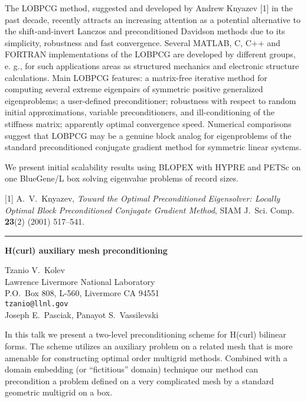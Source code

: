 \documentclass[twosided]{report}
\begin{document}
 The LOBPCG method,
suggested and developed by Andrew Knyazev [1] in the past
decade, recently attracts an increasing attention as a
potential alternative to the shift-and-invert Lanczos and
preconditioned Davidson methods due to its simplicity,
robustness and fast convergence. Several MATLAB, C, C++ and
FORTRAN implementations of the LOBPCG are developed by
different groups, e. g., for such applications areas as
structured mechanics and electronic structure calculations.
Main LOBPCG features: a matrix-free iterative method for
computing several extreme eigenpairs of symmetric positive
generalized eigenproblems; a user-defined preconditioner;
robustness with respect to random initial approximations,
variable preconditioners, and ill-conditioning of the
stiffness matrix; apparently optimal convergence speed.
Numerical comparisons suggest that LOBPCG may be a genuine
block analog for eigenproblems of the standard
preconditioned conjugate gradient method for symmetric
linear systems.

We present initial scalability results
using BLOPEX with HYPRE and PETSc on one BlueGene/L box
solving eigenvalue problems of record sizes.

[1] A.~V.~Knyazev, {\em Toward the Optimal Preconditioned
Eigensolver: Locally Optimal Block Preconditioned Conjugate
Gradient Method}, SIAM J.~Sci. Comp. {\bf 23}(2) (2001)
517--541.



	\begin{center} \rule{6in}{1pt} \end{center}

\begin{center}
{\large			%
{\bf H(curl) auxiliary mesh preconditioning}}

	Tzanio V.~Kolev \\
	Lawrence Livermore National Laboratory \\
	P.O.~Box 808, L-560, Livermore CA 94551 \\
	{\tt tzanio@llnl.gov} \\
	Joseph E.~Pasciak, Panayot S.~Vassilevski
\end{center}
In this talk we present a two-level preconditioning scheme
for H(curl) bilinear forms. The scheme utilizes an auxiliary
problem on a related mesh that is more amenable for
constructing optimal order multigrid methods. Combined with
a domain embedding (or ``fictitious'' domain) technique our
method can precondition a problem defined on a very
complicated mesh by a standard geometric multigrid on a box.
\end{document}
